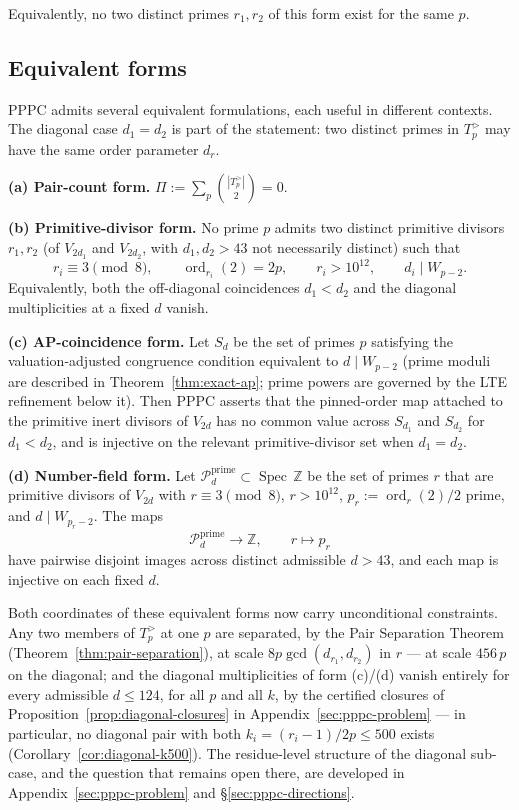 \documentclass[11pt]{amsart}
\theoremstyle{plain}
\theoremstyle{definition}
\theoremstyle{remark}
\numberwithin{equation}{section}
\newcommand{\ord}{\operatorname{ord}}
\newcommand{\Spec}{\operatorname{Spec}}
\newcommand{\Z}{\mathbb{Z}}
\begin{document}
Equivalently, no two distinct primes $r_1, r_2$ of this form exist for the same $p$.

\subsection{Equivalent forms}\label{sec:equiv-forms}

PPPC admits several equivalent formulations, each useful in different contexts. The diagonal case $d_1=d_2$ is part of the statement: two distinct primes in $T_p^{>}$ may have the same order parameter $d_r$.

\textbf{(a) Pair-count form.} $\Pi := \sum_p \binom{|T_p^{>}|}{2} = 0$.

\textbf{(b) Primitive-divisor form.} No prime $p$ admits two distinct primitive divisors $r_1,r_2$ (of $V_{2d_1}$ and $V_{2d_2}$, with $d_1,d_2>43$ not necessarily distinct) such that
\[
  r_i \equiv 3 \pmod 8,\qquad \ord_{r_i}(2)=2p,\qquad
  r_i>10^{12},\qquad d_i\mid W_{p-2}.
\]
Equivalently, both the off-diagonal coincidences $d_1<d_2$ and the diagonal multiplicities at a fixed $d$ vanish.

\textbf{(c) AP-coincidence form.} Let $S_d$ be the set of primes $p$ satisfying the valuation-adjusted congruence condition equivalent to $d\mid W_{p-2}$ (prime moduli are described in Theorem~\ref{thm:exact-ap}; prime powers are governed by the LTE refinement below it). Then PPPC asserts that the pinned-order map attached to the primitive inert divisors of $V_{2d}$ has no common value across $S_{d_1}$ and $S_{d_2}$ for $d_1<d_2$, and is injective on the relevant primitive-divisor set when $d_1=d_2$.

\textbf{(d) Number-field form.} Let $\mathcal{P}_d^{\mathrm{prime}} \subset \Spec\,\Z$ be the set of primes $r$ that are primitive divisors of $V_{2 d}$ with $r \equiv 3 \pmod 8$, $r > 10^{12}$, $p_r:=\ord_r(2)/2$ prime, and $d\mid W_{p_r-2}$. The maps
\[
  \mathcal{P}_d^{\mathrm{prime}} \longrightarrow \Z,\qquad r \longmapsto p_r
\]
have pairwise disjoint images across distinct admissible $d>43$, and each map is injective on each fixed $d$.

Both coordinates of these equivalent forms now carry unconditional constraints. Any two members of $T_p^{>}$ at one $p$ are separated, by the Pair Separation Theorem (Theorem~\ref{thm:pair-separation}), at scale $8 p \gcd(d_{r_1}, d_{r_2})$ in $r$ --- at scale $456\,p$ on the diagonal; and the diagonal multiplicities of form (c)/(d) vanish entirely for every admissible $d \leq 124$, for all $p$ and all $k$, by the certified closures of Proposition~\ref{prop:diagonal-closures} in Appendix~\ref{sec:pppc-problem} --- in particular, no diagonal pair with both $k_i = (r_i - 1)/2p \leq 500$ exists (Corollary~\ref{cor:diagonal-k500}). The residue-level structure of the diagonal sub-case, and the question that remains open there, are developed in Appendix~\ref{sec:pppc-problem} and \S\ref{sec:pppc-directions}.
\end{document}

